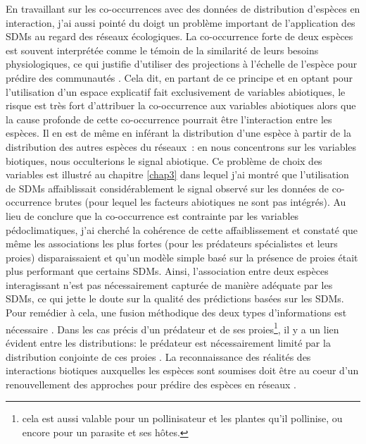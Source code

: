 En travaillant sur les co-occurrences avec des données de distribution
d'espèces en interaction, j'ai aussi pointé du doigt un problème
important de l'application des SDMs au regard des réseaux écologiques.
La co-occurrence forte de deux espèces est souvent interprétée comme le
témoin de la similarité de leurs besoins physiologiques, ce qui justifie
d'utiliser des projections à l'échelle de l'espèce pour prédire des
communautés \citep{Rehfeldt2006, Albouy2012}. Cela dit, en partant de ce
principe et en optant pour l'utilisation d'un espace explicatif fait
exclusivement de variables abiotiques, le risque est très fort
d'attribuer la co-occurrence aux variables abiotiques alors que la cause
profonde de cette co-occurrence pourrait être l'interaction entre les
espèces. Il en est de même en inférant la distribution d'une espèce à
partir de la distribution des autres espèces du réseaux~: en nous
concentrons sur les variables biotiques, nous occulterions le signal
abiotique. Ce problème de choix des variables est illustré au chapitre
\ref{chap3} dans lequel j'ai montré que l'utilisation de SDMs
affaiblissait considérablement le signal observé sur les données de
co-occurrence brutes (pour lequel les facteurs abiotiques ne sont pas
intégrés). Au lieu de conclure que la co-occurrence est contrainte par
les variables pédoclimatiques, j'ai cherché la cohérence de cette
affaiblissement et constaté que même les associations les plus fortes
(pour les prédateurs spécialistes et leurs proies) disparaissaient et
qu'un modèle simple basé sur la présence de proies était plus performant
que certains SDMs. Ainsi, l'association entre deux espèces interagissant
n'est pas nécessairement capturée de manière adéquate par les SDMs, ce
qui jette le doute sur la qualité des prédictions basées sur les SDMs.
Pour remédier à cela, une fusion méthodique des deux types
d'informations est nécessaire \citep{Meier2010, Thuiller2013}. Dans les
cas précis d'un prédateur et de ses proies\footnote{cela est aussi
  valable pour un pollinisateur et les plantes qu'il pollinise, ou
  encore pour un parasite et ses hôtes.}, il y a un lien évident entre
les distributions: le prédateur est nécessairement limité par la
distribution conjointe de ces proies \citep{Holt2009, Shenbrot2007}. La
reconnaissance des réalités des interactions biotiques auxquelles les
espèces sont soumises doit être au coeur d'un renouvellement des
approches pour prédire des espèces en réseaux \citep{Godsoe2015}.

